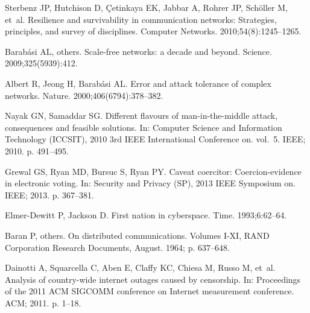 \documentclass[10pt,letterpaper]{article}
\begin{document}
%
%
% 
\begin{thebibliography}{10}

Sterbenz JP, Hutchison D, Çetinkaya EK, Jabbar A, Rohrer JP, Schöller M,
  et~al.
\newblock Resilience and survivability in communication networks: {Strategies},
  principles, and survey of disciplines.
\newblock Computer Networks. 2010;54(8):1245--1265.

Barabási AL, {others}.
\newblock Scale-free networks: a decade and beyond.
\newblock Science. 2009;325(5939):412.

Albert R, Jeong H, Barabási AL.
\newblock Error and attack tolerance of complex networks.
\newblock Nature. 2000;406(6794):378--382.

Nayak GN, Samaddar SG.
\newblock Different flavours of man-in-the-middle attack, consequences and
  feasible solutions.
\newblock In: Computer {Science} and {Information} {Technology} ({ICCSIT}),
  2010 3rd {IEEE} {International} {Conference} on. vol.~5. IEEE; 2010. p.
  491--495.

Grewal GS, Ryan MD, Bursuc S, Ryan PY.
\newblock Caveat coercitor: {Coercion}-evidence in electronic voting.
\newblock In: Security and {Privacy} ({SP}), 2013 {IEEE} {Symposium} on. IEEE;
  2013. p. 367--381.

Elmer-Dewitt P, Jackson D.
\newblock First nation in cyberspace.
\newblock Time. 1993;6:62--64.

Baran P, {others}.
\newblock On distributed communications.
\newblock Volumes I-XI, RAND Corporation Research Documents, August. 1964; p.
  637--648.

Dainotti A, Squarcella C, Aben E, Claffy KC, Chiesa M, Russo M, et~al.
\newblock Analysis of country-wide internet outages caused by censorship.
\newblock In: Proceedings of the 2011 {ACM} {SIGCOMM} conference on {Internet}
  measurement conference. ACM; 2011. p. 1--18.


\end{thebibliography}
\end{document}
